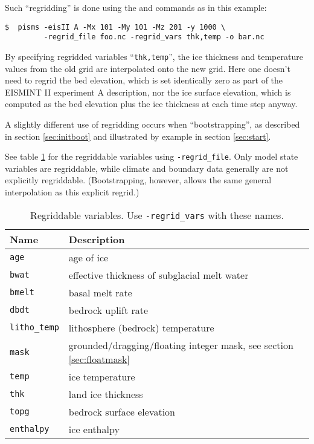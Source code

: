 Such ``regridding'' is done using the  and
 commands as in this example: 

\begin{verbatim}
$  pisms -eisII A -Mx 101 -My 101 -Mz 201 -y 1000 \
         -regrid_file foo.nc -regrid_vars thk,temp -o bar.nc
\end{verbatim}
\noindent By specifying regridded variables ``\texttt{thk,temp}'', the ice thickness and temperature values from the old grid are interpolated onto the new grid.  Here one doesn't need to regrid the bed elevation, which is set identically zero as part of the EISMINT II experiment A description, nor the ice surface elevation, which is computed as the bed elevation plus the ice thickness at each time step anyway.

A slightly different use of regridding occurs when ``bootstrapping'', as described in section \ref{sec:initboot} and illustrated by example in section \ref{sec:start}.

See table \ref{tab:regridvar} for the regriddable variables using
\texttt{-regrid_file}.  Only model state variables are regriddable, while climate and boundary data generally are not explicitly regriddable.  (Bootstrapping, however, allows the same general interpolation as this explicit regrid.)

\begin{table}[ht]
  \centering
  \begin{tabular}{ll}\toprule
    \textbf{Name} & \textbf{Description}\\ \midrule
    \texttt{age} & age of ice\\
    \texttt{bwat} & effective thickness of subglacial melt water \\
    \texttt{bmelt} & basal melt rate \\
    \texttt{dbdt} & bedrock uplift rate \\
    \texttt{litho_temp} & lithosphere (bedrock) temperature \\
    \texttt{mask} & grounded/dragging/floating integer mask, see section \ref{sec:floatmask} \\
    \texttt{temp} & ice temperature \\
    \texttt{thk} & land ice thickness \\
    \texttt{topg} & bedrock surface elevation \\
    \texttt{enthalpy} & ice enthalpy\\
    \bottomrule
  \end{tabular}
\caption{Regriddable variables.  Use \texttt{-regrid_vars} with these names.}
\label{tab:regridvar}
\end{table}

